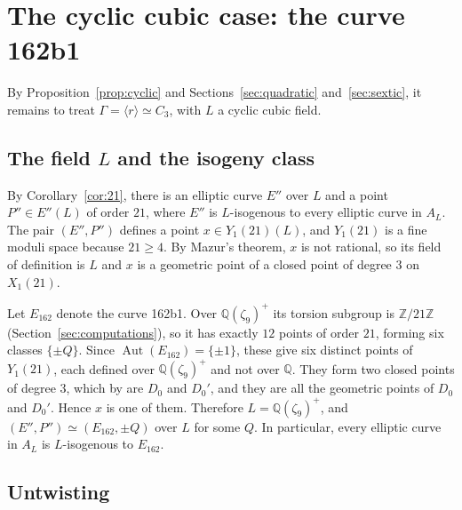 \documentclass[11pt]{article}
\newcommand{\Q}{\mathbb Q}
\newcommand{\Z}{\mathbb Z}
\DeclareMathOperator{\Aut}{Aut}
\begin{document}
\section{The cyclic cubic case: the curve 162b1}\label{sec:cubic}

By Proposition~\ref{prop:cyclic} and Sections~\ref{sec:quadratic}
and~\ref{sec:sextic}, it remains to treat
\(\Gamma=\langle r\rangle\simeq C_3\), with \(L\) a cyclic cubic field.

\subsection{The field \texorpdfstring{\(L\)}{L} and the isogeny class}\label{sec:field}

By Corollary~\ref{cor:21}, there is an elliptic curve \(E''\) over \(L\)
and a point \(P''\in E''(L)\) of order \(21\), where \(E''\) is
\(L\)-isogenous to every elliptic curve in \(A_L\). The pair
\((E'',P'')\) defines a point \(x\in Y_1(21)(L)\), and \(Y_1(21)\) is a
fine moduli space because \(21\geq4\). By Mazur's theorem, \(x\) is not
rational, so its field of definition is \(L\) and \(x\) is a geometric
point of a closed point of degree \(3\) on \(X_1(21)\).

Let \(E_{162}\) denote the curve 162b1. Over \(\Q(\zeta_9)^+\) its
torsion subgroup is \(\Z/21\Z\) (Section~\ref{sec:computations}), so it
has exactly \(12\) points of order \(21\), forming six classes
\(\{\pm Q\}\). Since \(\Aut(E_{162})=\{\pm1\}\), these give six distinct
points of \(Y_1(21)\), each defined over \(\Q(\zeta_9)^+\) and not over
\(\Q\). They form two closed points of degree \(3\), which by
\cite[Section 6.2]{DEvHMZB} are \(D_0\) and \(D_0'\), and they are all
the geometric points of \(D_0\) and \(D_0'\). Hence \(x\) is one of
them. Therefore \(L=\Q(\zeta_9)^+\), and
\((E'',P'')\simeq(E_{162},\pm Q)\) over \(L\) for some \(Q\). In
particular, every elliptic curve in \(A_L\) is \(L\)-isogenous to
\(E_{162}\).

\subsection{Untwisting}\label{sec:untwisting}
\end{document}
